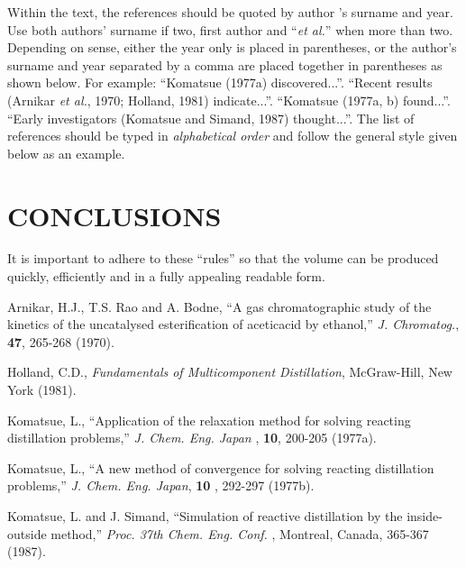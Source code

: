Within the text, the references should be quoted by author 's surname and
year. Use both authors' surname if two, first author and ``{\it et al.}''
when more than two. Depending on sense, either the year only is placed in
parentheses, or the author's surname and year separated by a comma are
placed together in parentheses as shown below. For example: ``Komatsue
(1977a) discovered...''. ``Recent results (Arnikar {\it et al.}, 1970;
Holland, 1981) indicate...''. ``Komatsue (1977a, b) found...''. ``Early
investigators (Komatsue and Simand, 1987) thought...''. The list of
references should be typed in {\it alphabetical order} and follow the
general style given below as an example.

\section{CONCLUSIONS}

It is important to adhere to these ``rules'' so that the volume can be
produced quickly, efficiently and in a fully appealing readable form.

\begin{thebibliography}{9}
  Arnikar, H.J., T.S. Rao and A. Bodne, ``A gas
chromatographic study of the kinetics of the uncatalysed esterification of
aceticacid by ethanol,'' {\it J. Chromatog.}, {\bf 47}, 265-268 (1970).

  Holland, C.D., {\it Fundamentals of Multicomponent
Distillation}, McGraw-Hill, New York (1981).

  Komatsue, L., ``Application of the relaxation
method for solving reacting distillation problems,'' {\it J. Chem. Eng. Japan%
}, {\bf 10}, 200-205 (1977a).

  Komatsue, L., ``A new method of convergence for
solving reacting distillation problems,'' {\it J. Chem. Eng. Japan}, {\bf 10}%
, 292-297 (1977b).

  Komatsue, L. and J. Simand, ``Simulation of reactive
distillation by the inside-outside method,'' {\it Proc. 37th Chem. Eng. Conf.%
}, Montreal, Canada, 365-367 (1987).
\end{thebibliography}


